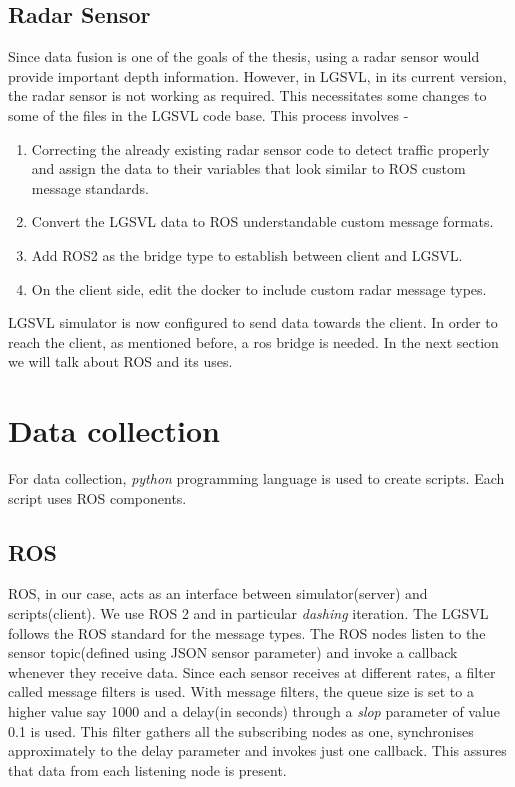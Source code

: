\subsection{Radar Sensor}
Since data fusion is one of the goals of the thesis, using a radar sensor would provide
important depth information. However, in LGSVL, in its current version, the radar sensor is not working as
required. This necessitates some changes to some of the files in the LGSVL code base.
This process involves -
\begin{enumerate}
    \item Correcting the already existing radar sensor code to detect traffic properly and
        assign the data to their variables that look similar to ROS custom message standards.
    \item Convert the LGSVL data to ROS understandable  custom message formats.
    \item Add ROS2 as the bridge type to establish between client and LGSVL.
    \item On the client side, edit the docker to include custom radar message types.
\end{enumerate}

LGSVL simulator is now configured to send data towards the client. In order to reach the
client, as mentioned before, a ros bridge is needed. In the next section we will talk
about ROS and its uses.

\section{Data collection}
For data collection, \textit{python} programming language is used to create scripts. Each
script uses ROS components.

\subsection{ROS}
ROS, in our case, acts as an interface between simulator(server) and scripts(client).
We use ROS 2 and in particular \textit{dashing} iteration. The LGSVL follows the ROS standard for the message types.
The ROS nodes listen to the sensor topic(defined using JSON sensor parameter) and invoke
a callback whenever they receive data. Since each sensor receives at different rates, a
filter called message filters is used. With message filters, the queue size is set to a
higher value say 1000 and a delay(in seconds) through a \textit{slop} parameter of value
0.1 is used. This filter gathers all the subscribing nodes as one, synchronises
approximately to the delay parameter and invokes just one callback. This assures that data
from each listening node is present.

